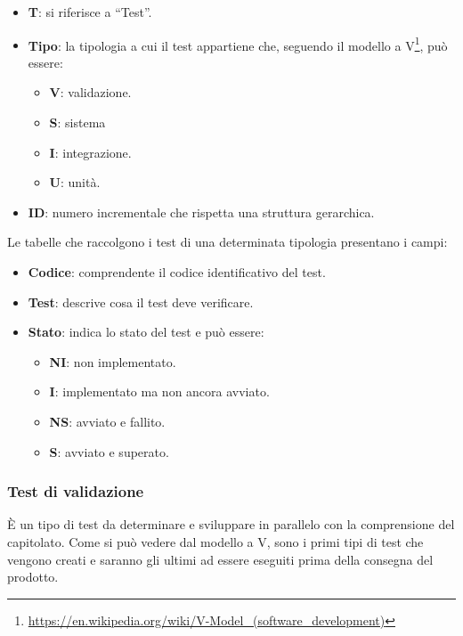 \begin{itemize}
	\item \textbf{T}: si riferisce a ``Test''.
	\item \textbf{Tipo}: la tipologia a cui il test appartiene che, seguendo il modello a V\footnote{\url{https://en.wikipedia.org/wiki/V-Model_(software_development)}}, può essere:
	\begin{itemize}
		\item \textbf{V}: validazione. %
		\item \textbf{S}: sistema
		\item \textbf{I}: integrazione.
		\item \textbf{U}: unità.
		\end{itemize}
	\item \textbf{ID}: numero incrementale che rispetta una struttura gerarchica.
\end{itemize}

\newcommand{\TNI}{{\color{gray}\textbf{NI}}}
\newcommand{\TI}{{\color{blue}\textbf{I}}}
\newcommand{\TNS}{{\color{red}\textbf{NS}}}
\newcommand{\TS}{{\color{green}\textbf{S}}}

Le tabelle che raccolgono i test di una determinata tipologia presentano i campi:
\begin{itemize}
	\item \textbf{Codice}: comprendente il codice identificativo del test.
	\item \textbf{Test}: descrive cosa il test deve verificare.
	\item \textbf{Stato}: indica lo stato del test e può essere:
	\begin{itemize}
		\item \TNI: non implementato.
		\item \TI: implementato ma non ancora avviato.
		\item \TNS: avviato e fallito.
		\item \TS: avviato e superato.
	\end{itemize}
\end{itemize}

\subsubsection{Test di validazione} \label{testvalidazione}
È un tipo di test da determinare e sviluppare in parallelo con la comprensione del capitolato.
Come si può vedere dal modello a V, sono i primi tipi di test che vengono creati e saranno gli ultimi ad essere eseguiti prima della consegna del prodotto.

